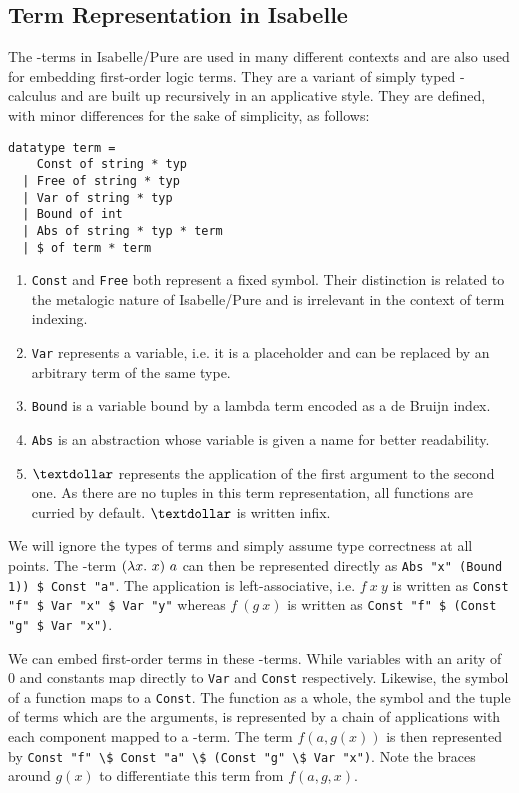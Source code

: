 \subsection{Term Representation in Isabelle}
The \lam -terms in Isabelle/Pure are used in many different contexts and are also used for embedding first-order logic terms. They are a variant of simply typed \lam -calculus and are built up recursively in an applicative style. They are defined, with minor differences for the sake of simplicity, as follows:
\begin{lstlisting}
datatype term =
    Const of string * typ
  | Free of string * typ
  | Var of string * typ
  | Bound of int
  | Abs of string * typ * term
  | $ of term * term
\end{lstlisting} %
\begin{enumerate}
  \item \verb!Const! and \verb!Free! both represent a fixed symbol. Their distinction is related to the metalogic nature of Isabelle/Pure and is irrelevant in the context of term indexing.
  \item \verb!Var! represents a variable, i.e. it is a placeholder and can be replaced by an arbitrary term of the same type.
  \item \verb!Bound! is a variable bound by a lambda term encoded as a de Bruijn index.
  \item \verb!Abs! is an abstraction whose variable is given a name for better readability.
  \item $\textdollar$ represents the application of the first argument to the second one. As there are no tuples in this term representation, all functions are curried by default. $\textdollar$ is written infix.
\end{enumerate}

We will ignore the types of terms and simply assume type correctness at all points. The \lam -term $(\lam x.\ x)\ a$ can then be represented directly as \verb!Abs "x" (Bound 1)) $ Const "a"!. The application is left-associative, i.e. $f\ x\ y$ is written as \verb!Const "f" $ Var "x" $ Var "y"! whereas $f\ (g\ x)$ is written as \verb!Const "f" $ (Const "g" $ Var "x")!.

We can embed first-order terms in these \lam -terms. While variables with an arity of $0$ and constants map directly to \verb!Var! and \verb!Const! respectively. Likewise, the symbol of a function maps to a \verb!Const!. The function as a whole, the symbol and the tuple of terms which are the arguments, is represented by a chain of applications with each component mapped to a \lam -term. The term $f(a,g(x))$ is then represented by \verb!Const "f" \$ Const "a" \$ (Const "g" \$ Var "x")!. Note the braces around $g(x)$ to differentiate this term from $f(a,g,x)$.

